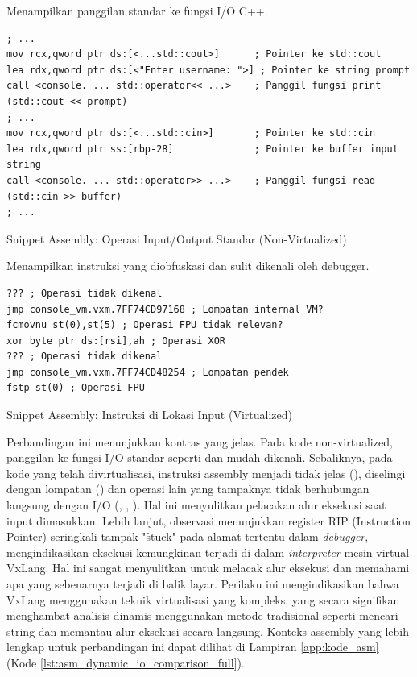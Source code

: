  Menampilkan panggilan standar ke fungsi I/O C++.
\begin{listing}[H]
    \begin{verbatim}
; ...
mov rcx,qword ptr ds:[<...std::cout>]      ; Pointer ke std::cout
lea rdx,qword ptr ds:[<"Enter username: ">] ; Pointer ke string prompt
call <console. ... std::operator<< ...>    ; Panggil fungsi print (std::cout << prompt)
; ...
mov rcx,qword ptr ds:[<...std::cin>]       ; Pointer ke std::cin
lea rdx,qword ptr ss:[rbp-28]              ; Pointer ke buffer input string
call <console. ... std::operator>> ...>    ; Panggil fungsi read (std::cin >> buffer)
; ...
\end{verbatim}
\caption{Snippet Assembly: Operasi Input/Output Standar (Non-Virtualized)}
\label{lst:asm_dynamic_io_nonvirt_snippet}
\end{listing}

 Menampilkan instruksi yang diobfuskasi dan sulit dikenali oleh debugger.
\begin{listing}[H]
    \begin{verbatim}
??? ; Operasi tidak dikenal
jmp console_vm.vxm.7FF74CD97168 ; Lompatan internal VM?
fcmovnu st(0),st(5) ; Operasi FPU tidak relevan?
xor byte ptr ds:[rsi],ah ; Operasi XOR
??? ; Operasi tidak dikenal
jmp console_vm.vxm.7FF74CD48254 ; Lompatan pendek
fstp st(0) ; Operasi FPU
\end{verbatim}
\caption{Snippet Assembly: Instruksi di Lokasi Input (Virtualized)}
\label{lst:asm_dynamic_io_virt_snippet}
\end{listing}

Perbandingan ini menunjukkan kontras yang jelas. Pada kode non-virtualized, panggilan ke fungsi I/O standar seperti  dan  mudah dikenali. Sebaliknya, pada kode yang telah divirtualisasi, instruksi assembly menjadi tidak jelas (), diselingi dengan lompatan () dan operasi lain yang tampaknya tidak berhubungan langsung dengan I/O (, , ). Hal ini menyulitkan pelacakan alur eksekusi saat input dimasukkan. Lebih lanjut, observasi menunjukkan register RIP (\f{Instruction Pointer}) seringkali tampak "\f{stuck}" pada alamat tertentu dalam \textit{debugger}, mengindikasikan eksekusi kemungkinan terjadi di dalam \textit{interpreter} mesin virtual VxLang. Hal ini sangat menyulitkan untuk melacak alur eksekusi dan memahami apa yang sebenarnya terjadi di balik layar. Perilaku ini mengindikasikan bahwa VxLang menggunakan teknik virtualisasi yang kompleks, yang secara signifikan menghambat analisis dinamis menggunakan metode tradisional seperti mencari string dan memantau alur eksekusi secara langsung. Konteks assembly yang lebih lengkap untuk perbandingan ini dapat dilihat di Lampiran \ref{app:kode_asm} (Kode \ref{lst:asm_dynamic_io_comparison_full}).


